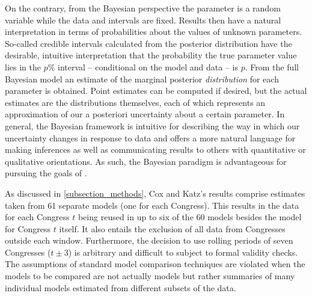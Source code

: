 On the contrary, from the Bayesian perspective the parameter is a random 
variable while the data and intervals are fixed. Results then have a natural 
interpretation in terms of probabilities about the values of unknown parameters. 
So-called credible intervals calculated from the posterior distribution have the 
desirable, intuitive interpretation that the probability the true parameter value 
lies in the $p\%$ interval  -- conditional on the model and data -- is $p$.
From the full Bayesian model an estimate of the marginal posterior {\it distribution} 
for each parameter is obtained. Point estimates can be computed if desired, but the actual 
estimates are the distributions themselves, each of which represents an approximation of 
our a posteriori uncertainty about a certain parameter. In general, the Bayesian framework 
is intuitive for describing the way in which our uncertainty changes in response to data and 
offers a more natural language for making inferences as well as communicating results to others
with quantitative or qualitative orientations. As such, the Bayesian paradigm is advantageous for
pursuing the goals of . 
 
 
As discussed in \ref{subsection_methods}, Cox and Katz's results comprise estimates taken 
from 61 separate models (one for each Congress). This results in the data for each Congress 
$t$ being reused in up to six of the 60 models besides the model for Congress $t$ itself. It also 
entails the exclusion of all data from Congresses outside each window. Furthermore, the decision
to use rolling periods of seven Congresses ($t \pm 3$) is arbitrary and difficult to subject to formal
validity checks. The assumptions of standard model comparison techniques are violated when the 
models to be compared are not actually models but rather summaries of many individual 
models estimated from different subsets of the data. 

